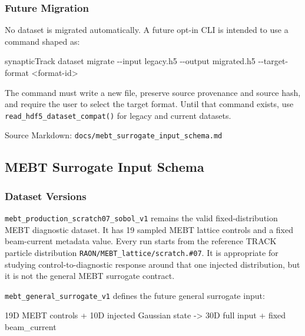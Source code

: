 \documentclass[
]{article}
\newenvironment{Shaded}{}{}
\newcommand{\AttributeTok}[1]{\textcolor[rgb]{0.49,0.56,0.16}{#1}}
\newcommand{\ExtensionTok}[1]{#1}
\newcommand{\NormalTok}[1]{#1}
\newcommand{\OperatorTok}[1]{\textcolor[rgb]{0.40,0.40,0.40}{#1}}
\begin{document}
\hypertarget{future-migration}{%
\subsubsection{Future Migration}\label{future-migration}}

No dataset is migrated automatically. A future opt-in CLI is intended to
use a command shaped as:

\begin{Shaded}
\begin{Highlighting}[]
\ExtensionTok{synapticTrack}\NormalTok{ dataset migrate }\AttributeTok{{-}{-}input}\NormalTok{ legacy.h5 }\AttributeTok{{-}{-}output}\NormalTok{ migrated.h5 }\AttributeTok{{-}{-}target{-}format} \OperatorTok{\textless{}}\NormalTok{format{-}id}\OperatorTok{\textgreater{}}
\end{Highlighting}
\end{Shaded}

The command must write a new file, preserve source provenance and source
hash, and require the user to select the target format. Until that
command exists, use \texttt{read\_hdf5\_dataset\_compat()} for legacy
and current datasets.

Source Markdown: \texttt{docs/mebt\_surrogate\_input\_schema.md}

\hypertarget{mebt-surrogate-input-schema}{%
\subsection{MEBT Surrogate Input
Schema}\label{mebt-surrogate-input-schema}}

\hypertarget{dataset-versions}{%
\subsubsection{Dataset Versions}\label{dataset-versions}}

\texttt{mebt\_production\_scratch07\_sobol\_v1} remains the valid
fixed-distribution MEBT diagnostic dataset. It has 19 sampled MEBT
lattice controls and a fixed beam-current metadata value. Every run
starts from the reference TRACK particle distribution
\texttt{RAON/MEBT\_lattice/scratch.\#07}. It is appropriate for studying
control-to-diagnostic response around that one injected distribution,
but it is not the general MEBT surrogate contract.

\texttt{mebt\_general\_surrogate\_v1} defines the future general
surrogate input:

\begin{Shaded}
\begin{Highlighting}[]
\NormalTok{19D MEBT controls + 10D injected Gaussian state {-}\textgreater{} 30D full input}
\NormalTok{                                             + fixed beam\_current}
\end{Highlighting}
\end{Shaded}
\end{document}
